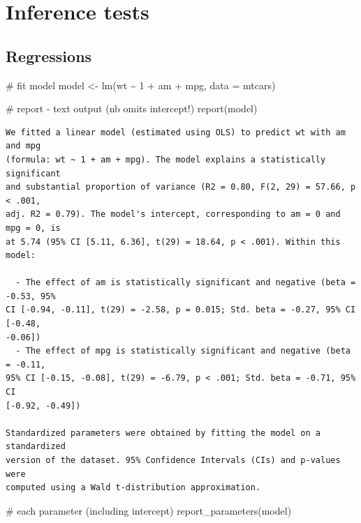 \documentclass[
  letterpaper,
  DIV=11,
  numbers=noendperiod]{scrreprt}
\newenvironment{Shaded}{\begin{snugshade}}{\end{snugshade}}
\newcommand{\AttributeTok}[1]{\textcolor[rgb]{0.40,0.45,0.13}{#1}}
\newcommand{\CommentTok}[1]{\textcolor[rgb]{0.37,0.37,0.37}{#1}}
\newcommand{\DecValTok}[1]{\textcolor[rgb]{0.68,0.00,0.00}{#1}}
\newcommand{\FunctionTok}[1]{\textcolor[rgb]{0.28,0.35,0.67}{#1}}
\newcommand{\NormalTok}[1]{\textcolor[rgb]{0.00,0.23,0.31}{#1}}
\newcommand{\OtherTok}[1]{\textcolor[rgb]{0.00,0.23,0.31}{#1}}
\newcommand{\SpecialCharTok}[1]{\textcolor[rgb]{0.37,0.37,0.37}{#1}}
\begin{document}
\section{Inference tests}\label{inference-tests}

\subsection{Regressions}\label{regressions}

\begin{Shaded}
\begin{Highlighting}[]
\CommentTok{\# fit model}
\NormalTok{model }\OtherTok{\textless{}{-}} \FunctionTok{lm}\NormalTok{(wt }\SpecialCharTok{\textasciitilde{}} \DecValTok{1} \SpecialCharTok{+}\NormalTok{ am }\SpecialCharTok{+}\NormalTok{ mpg, }\AttributeTok{data =}\NormalTok{ mtcars)}

\CommentTok{\# report {-} text output (nb omits intercept!)}
\FunctionTok{report}\NormalTok{(model)}
\end{Highlighting}
\end{Shaded}

\begin{verbatim}
We fitted a linear model (estimated using OLS) to predict wt with am and mpg
(formula: wt ~ 1 + am + mpg). The model explains a statistically significant
and substantial proportion of variance (R2 = 0.80, F(2, 29) = 57.66, p < .001,
adj. R2 = 0.79). The model's intercept, corresponding to am = 0 and mpg = 0, is
at 5.74 (95% CI [5.11, 6.36], t(29) = 18.64, p < .001). Within this model:

  - The effect of am is statistically significant and negative (beta = -0.53, 95%
CI [-0.94, -0.11], t(29) = -2.58, p = 0.015; Std. beta = -0.27, 95% CI [-0.48,
-0.06])
  - The effect of mpg is statistically significant and negative (beta = -0.11,
95% CI [-0.15, -0.08], t(29) = -6.79, p < .001; Std. beta = -0.71, 95% CI
[-0.92, -0.49])

Standardized parameters were obtained by fitting the model on a standardized
version of the dataset. 95% Confidence Intervals (CIs) and p-values were
computed using a Wald t-distribution approximation.
\end{verbatim}

\begin{Shaded}
\begin{Highlighting}[]
\CommentTok{\# each parameter (including intercept)}
\FunctionTok{report\_parameters}\NormalTok{(model)}
\end{Highlighting}
\end{Shaded}
\end{document}
